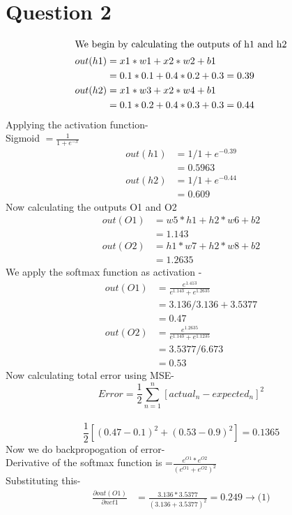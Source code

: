 \documentclass[12pt]{article}
\begin{document}
\section{Question 2}
\begin{align*}
\intertext{We begin by calculating the outputs of h1 and h2}
    out(h1) 
    &=x1 * w1 + x2 * w2 +b1 \\
    &=0.1*0.1+0.4*0.2+0.3=0.39 \\
    out(h2)
    &=x1 * w3 + x2 * w4 +b1 \\
    &=0.1*0.2+0.4*0.3+0.3=0.44
\end{align*}
Applying the activation function-\\
Sigmoid $=\frac{1}{1+e^{-x}} $\\
\begin{align*}
    out(h1)
    &=1/1+e^{-0.39} \\
    &=0.5963\\
    out(h2)
    &=1/1+e^{-0.44}\\
    &=0.609
\end{align*}
Now calculating the outputs O1 and O2 \\
\begin{align*}
    out(O1)
    &= w5*h1+h2*w6+b2 \\
    &=1.143\\
    out(O2)
    &= h1*w7+h2*w8+b2 \\
    &=1.2635 
\end{align*}
We apply the softmax function as activation -\\
\begin{align*}
    out(O1)
    &=\frac{e^{1.413}}{e^{1.143}+e^{1.2635}} \\
    &=3.136/3.136+3.5377\\
    &=0.47\\
    out(O2)
    &=\frac{e^{1.2635}}{e^{1.143}+e^{1.1235}}\\
    &=3.5377/6.673\\
    &=0.53
\end{align*}
Now calculating total error using MSE-
\[Error=\frac{1}{2} \sum_{n=1}^{n} [actual_n-expected_n]^{2} \]\ 
\[\frac{1}{2}[(0.47-0.1)^2 + (0.53-0.9)^2]=0.1365 \]
Now we do backpropogation of error-\\
Derivative of the softmax function is =$\frac{e^{O1} * e^{O2}}{(e^{O1} + e^{O2})^{2}}$\\
Substituting this-
\begin{align*}
     \frac{\partial out(O1)}{\partial net1} &=\frac{3.136*3.5377}{(3.136+3.5377)^{2}}=0.249 \longrightarrow \text{(1)}
\end{align*}
\end{document}
